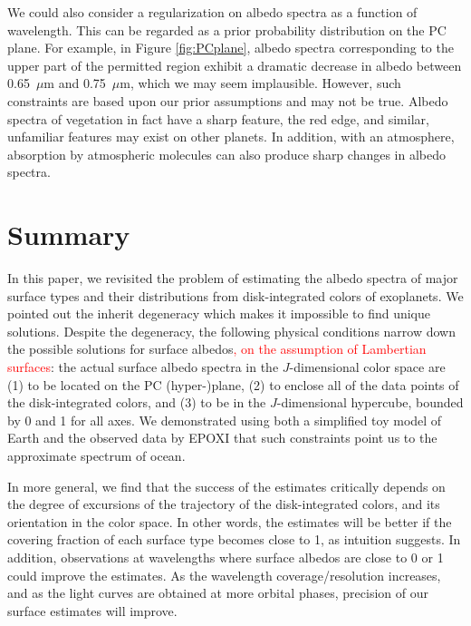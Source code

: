 \documentclass[iop,numberedappendix,apj]{emulateapj}
\def\edit#1{\textcolor{red}{#1}}
\begin{document}
We could also consider a regularization on albedo spectra as a function of wavelength. 
This can be regarded as a prior probability distribution on the PC plane. 
For example, in Figure \ref{fig:PCplane}, albedo spectra corresponding to the upper part of the permitted region exhibit a dramatic decrease in albedo between 0.65~$\mu $m and 0.75~$\mu $m, which we may seem implausible. 
However, such constraints are based upon our prior assumptions and may not be true. 
Albedo spectra of vegetation in fact have a sharp feature, the red edge, and similar, unfamiliar features may exist on other planets. 
In addition, with an atmosphere, absorption by atmospheric molecules can also produce sharp changes in albedo spectra. 


\section{Summary}
\label{s:conclusion}

In this paper, we revisited the problem of estimating the albedo spectra of major surface types and their distributions from disk-integrated colors of exoplanets. 
We pointed out the inherit degeneracy which makes it impossible to find unique solutions. 
Despite the degeneracy, the following physical conditions narrow down the possible solutions for surface albedos\edit{, on the assumption of Lambertian surfaces}:
the actual surface albedo spectra in the $J$-dimensional color space are (1) to be located on the PC (hyper-)plane, (2) to enclose all of the data points of the disk-integrated colors, and (3) to be in the $J$-dimensional hypercube, bounded by 0 and 1 for all axes. %
We demonstrated using both a simplified toy model of Earth and the observed data by EPOXI that such constraints point us to the approximate spectrum of ocean. 

In more general, we find that the success of the estimates critically depends on the degree of excursions of the trajectory of the disk-integrated colors, and its orientation in the color space.  %
In other words, the estimates will be better if the covering fraction of each surface type becomes close to 1, as intuition suggests. 
In addition, observations at wavelengths where surface albedos are close to 0 or 1 could improve the estimates. 
As the wavelength coverage/resolution increases, and as the light curves are obtained at more orbital phases, precision of our surface estimates will improve. 
\end{document}
